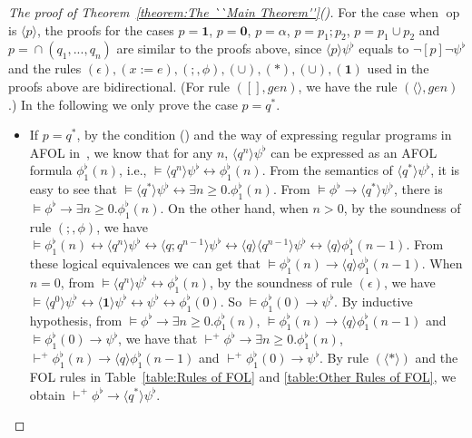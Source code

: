 \documentclass{fcs}
\newcommand{\la}[0]{\langle}
\newcommand{\ra}[0]{\rangle}
\newcommand{\rmn}[1]{(\romannumeral#1)}
\newcommand{\noth}[0]{\mathbf{1}}
\newcommand{\halt}[0]{\mathbf{0}}
\DeclareMathOperator{\seq}{;}
\DeclareMathOperator{\para}{\cap}
\newcommand{\reld}[0]{\mathit{\vdash^+}}
\begin{document}
\begin{proof}[The proof of Theorem~\ref{theorem:The ``Main Theorem''}\rmn{2}]
For the case when $\mathop{op}$ is $\la p\ra$, the proofs for the cases $p=\noth$, $p=\halt$, $p=\alpha$, $p=p_1\seq p_2$, $p=p_1\cup p_2$ and $p=\para(q_1,...,q_n)$ are similar to the proofs above, since $\la p\ra\psi^\flat$ equals to $\neg[p]\neg \psi^\flat$ and the rules $(\epsilon), (x:=e), (\seq, \phi), (\cup), (*), (\cup), (\noth)$ used in the proofs above are bidirectional. (For rule $([],\mathit{gen})$, we have the rule $(\la\ra, \mathit{gen})$.)
In the following we only prove the case $p=q^*$.

\begin{itemize}
    \item If $p=q^*$, by the condition \rmn{1} and the way of expressing regular programs in AFOL in~\cite{Harel79}, we know that for any $n$, $\la q^n\ra\psi^\flat$ can be expressed as an AFOL formula $\phi^\flat_1(n)$,
    i.e., $\models \la q^n\ra \psi^\flat\leftrightarrow \phi^\flat_1(n)$.
    From the semantics of $\la q^*\ra \psi^\flat$, it is easy to see that $\models \la q^*\ra \psi^\flat\leftrightarrow \exists n\ge 0. \phi^\flat_1(n)$.
    From $\models \phi^\flat\to \la q^*\ra\psi^\flat$, there is $\models \phi^\flat\to \exists n\ge 0. \phi^\flat_1(n)$.
    On the other hand, when $n>0$, by the soundness of rule $(\seq, \phi)$, we have $\models \phi^\flat_1(n)\leftrightarrow \la q^n\ra \psi^\flat\leftrightarrow \la q\seq q^{n-1}\ra\psi^\flat\leftrightarrow \la q\ra\la q^{n-1}\ra\psi^\flat\leftrightarrow \la q\ra \phi^\flat_1(n-1)$.
    From these logical equivalences we can get that $\models \phi^\flat_1(n)\to \la q\ra \phi^\flat_1(n-1)$.
    When $n=0$, from $\models \la q^n\ra \psi^\flat\leftrightarrow \phi^\flat_1(n)$, by the soundness of rule $(\epsilon)$, we have $\models \la q^0\ra\psi^\flat \leftrightarrow \la \noth\ra \psi^\flat\leftrightarrow \psi^\flat \leftrightarrow \phi^\flat_1(0)$. So $\models \phi^\flat_1(0)\to \psi^\flat$.
    By inductive hypothesis, from $\models \phi^\flat\to \exists n\ge 0. \phi^\flat_1(n)$, $\models \phi^\flat_1(n)\to \la q\ra \phi^\flat_1(n-1)$ and $\models \phi^\flat_1(0)\to \psi^\flat$,
    we have that $\reld \phi^\flat\to \exists n\ge 0. \phi^\flat_1(n)$, $\reld \phi^\flat_1(n)\to \la q\ra \phi^\flat_1(n-1)$ and $\reld \phi^\flat_1(0)\to \psi^\flat$.
    By rule $(\la*\ra)$ and the FOL rules in Table~\ref{table:Rules of FOL} and \ref{table:Other Rules of FOL}, we obtain $\reld \phi^\flat\to \la q^*\ra \psi^\flat$.
\end{itemize}
\end{proof}
\end{document}

